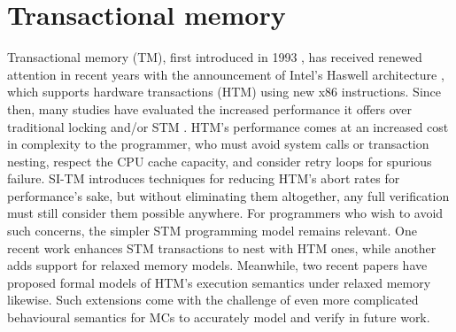 


\section{Transactional memory}

Transactional memory (TM), first introduced in 1993 \cite{transactional-memory},
has received renewed attention in recent years with the announcement of Intel's Haswell architecture \cite{htm-haswell},
which supports hardware transactions (HTM) using new x86 instructions.
Since then, many studies have evaluated the increased performance it offers over traditional locking and/or STM
\cite{htm-experience,htm-performance,tm-benchmark-cmu}.
%
HTM's performance comes at an increased cost in complexity to the programmer,
who must avoid system calls or transaction nesting, respect the CPU cache capacity,
and consider retry loops for spurious failure.
SI-TM \cite{si-tm} introduces techniques for reducing HTM's abort rates for performance's sake,
but without eliminating them altogether, any full verification must still consider them possible anywhere.
For programmers who wish to avoid such concerns,
the simpler STM programming model remains relevant.
One recent work \cite{hybrid-htm-stm} enhances STM transactions to nest with HTM ones,
while another \cite{stm-relaxed-memory} adds support for relaxed memory models.
Meanwhile, two recent papers \cite{relaxed-transactions-pldi,relaxed-transactions-popl}
have proposed formal models of HTM's execution semantics under relaxed memory likewise.
Such extensions come with the challenge of even more complicated behavioural semantics
for MCs to accurately model and verify in future work.

